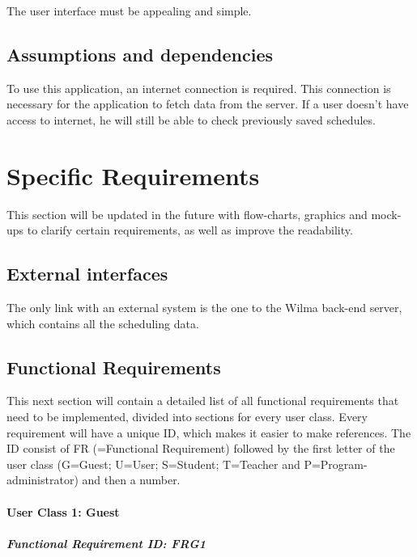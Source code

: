 \documentclass[12pt]{article}
\begin{document}
The user interface must be appealing and simple.

\subsection{Assumptions and
dependencies}\label{assumptions-and-dependencies}

To use this application, an internet connection is required. This
connection is necessary for the application to fetch data from the
server. If a user doesn't have access to internet, he will still be able
to check previously saved schedules.

\section{Specific Requirements}\label{specific-requirements}

This section will be updated in the future with flow-charts, graphics
and mock-ups to clarify certain requirements, as well as improve the
readability.

\subsection{External interfaces}\label{external-interfaces}

The only link with an external system is the one to the Wilma back-end
server, which contains all the scheduling data.

\subsection{Functional
Requirements}\label{functional-requirements}

This next section will contain a detailed list of all functional
requirements that need to be implemented, divided into sections for
every user class. Every requirement will have a unique ID, which makes
it easier to make references. The ID consist of FR (=Functional
Requirement) followed by the first letter of the user class (G=Guest;
U=User; S=Student; T=Teacher and P=Program-administrator) and then a
number.

\paragraph{User Class 1: Guest}\label{user-class-1-guest}

\subparagraph{Functional Requirement \textbf{ID}:
FRG1}\label{functional-requirement-id-frg1}
\end{document}
